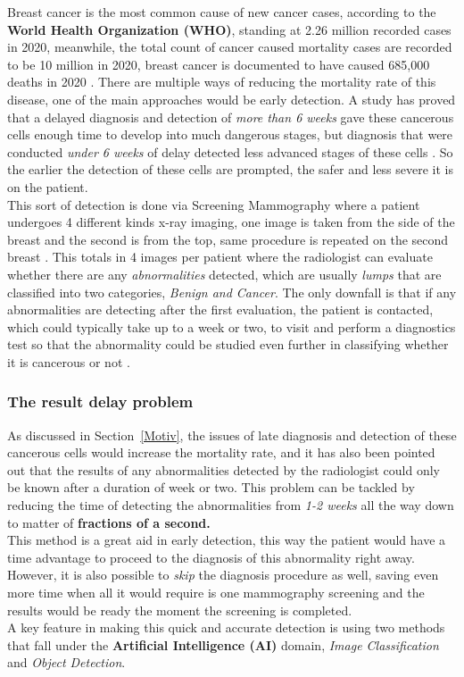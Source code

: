 \documentclass[12pt]{extarticle}
\begin{document}
	Breast cancer is the most common cause of new cancer cases, according to the \textbf{World Health Organization (WHO)}, standing at 2.26 million recorded cases in 2020, meanwhile, the total count of cancer caused mortality cases are recorded to be 10 million in 2020, breast cancer is documented to have caused 685,000 deaths in 2020 \cite{WHO_stats}. There are multiple ways of reducing the mortality rate of this disease, one of the main approaches would be early detection. A study has proved that a delayed diagnosis and detection of \emph{more than 6 weeks} gave these cancerous cells enough time to develop into much dangerous stages, but diagnosis that were conducted \emph{under 6 weeks} of delay detected less advanced stages of these cells \cite{caplan2014delay}. So the earlier the detection of these cells are prompted, the safer and less severe it is on the patient.
	\\[5mm]
	This sort of detection is done via Screening Mammography where a patient undergoes 4 different kinds x-ray imaging, one image is taken from the side of the breast and the second is from the top, same procedure is repeated on the second breast \cite{healthline}. This totals in 4 images per patient where the radiologist can evaluate whether there are any \emph{abnormalities} detected, which are usually \emph{lumps} that are classified into two categories, \emph{Benign and Cancer}. The only downfall is that if any abnormalities are detecting after the first evaluation, the patient is contacted, which could typically take up to a week or two, to visit and perform a diagnostics test so that the abnormality could be studied even further in classifying whether it is cancerous or not \cite{healthline}.\\[5mm]
	
	\subsubsection{The result delay problem}\label{delay problem}
	As discussed in Section~\ref{Motiv}, the issues of late diagnosis and detection of these cancerous cells would increase the mortality rate, and it has also been pointed out that the results of any abnormalities detected by the radiologist could only be known after a duration of week or two. This problem can be tackled by reducing the time of detecting the abnormalities from \emph{1-2 weeks} all the way down to matter of \textbf{fractions of a second.}\\[5mm]
	This method is a great aid in early detection, this way the patient would have a time advantage to proceed to the diagnosis of this abnormality right away. However, it is also possible to \emph{skip} the diagnosis procedure as well, saving even more time when all it would require is one mammography screening and the results would be ready the moment the screening is completed.\\[5mm]
	A key feature in making this quick and accurate detection is using two methods that fall under the \textbf{Artificial Intelligence (AI)} domain, \emph{Image Classification} and \emph{Object Detection}.
	
\end{document}
